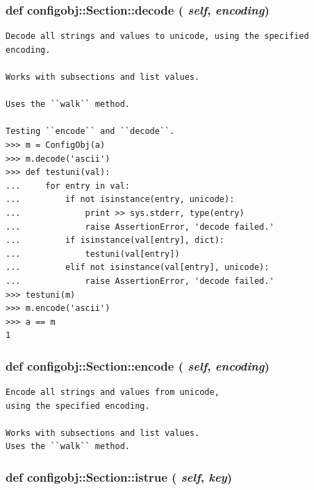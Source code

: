 \subsubsection{\setlength{\rightskip}{0pt plus 5cm}def configobj::Section::decode ( {\em self},  {\em encoding})}\label{classconfigobj_1_1Section_692aaec5d4c624794a3828a2f285225a}




\footnotesize\begin{verbatim}
Decode all strings and values to unicode, using the specified encoding.

Works with subsections and list values.

Uses the ``walk`` method.

Testing ``encode`` and ``decode``.
>>> m = ConfigObj(a)
>>> m.decode('ascii')
>>> def testuni(val):
...     for entry in val:
...         if not isinstance(entry, unicode):
...             print >> sys.stderr, type(entry)
...             raise AssertionError, 'decode failed.'
...         if isinstance(val[entry], dict):
...             testuni(val[entry])
...         elif not isinstance(val[entry], unicode):
...             raise AssertionError, 'decode failed.'
>>> testuni(m)
>>> m.encode('ascii')
>>> a == m
1
\end{verbatim}
\normalsize
\subsubsection{\setlength{\rightskip}{0pt plus 5cm}def configobj::Section::encode ( {\em self},  {\em encoding})}\label{classconfigobj_1_1Section_c516f79e00151a857425a08295c017fa}




\footnotesize\begin{verbatim}
Encode all strings and values from unicode,
using the specified encoding.

Works with subsections and list values.
Uses the ``walk`` method.
\end{verbatim}
\normalsize
\subsubsection{\setlength{\rightskip}{0pt plus 5cm}def configobj::Section::istrue ( {\em self},  {\em key})}\label{classconfigobj_1_1Section_fc6d42977c16329475dd3e7d068e1b38}




